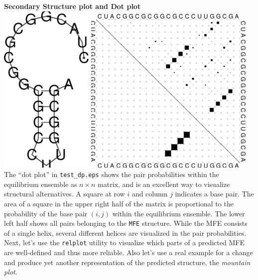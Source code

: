 \documentclass[]{article}
\begin{document}
\textbf{Secondary Structure plot and Dot plot}\\
 \includegraphics{Figs/test_ss.png}
\includegraphics{Figs/test_dp.png}\\
The ``dot plot'' in \texttt{test\_dp.eps} shows the pair probabilities
within the equilibrium ensemble as \(n \times n\) matrix, and is an
excellent way to visualize structural alternatives. A square at row
\(i\) and column \(j\) indicates a base pair. The area of a square in
the upper right half of the matrix is proportional to the probability of
the base pair \(\left( {i,j} \right)\) within the equilibrium ensemble.
The lower left half shows all pairs belonging to the \texttt{MFE}
structure. While the MFE consists of a single helix, several different
helices are visualized in the pair probabilities.\\
 Next, let's use the \texttt{relplot} utility to visualize which parts
of a predicted MFE are well-defined and thus more reliable. Also let's
use a real example for a change and produce yet another representation
of the predicted structure, the \emph{mountain plot}.
\end{document}
